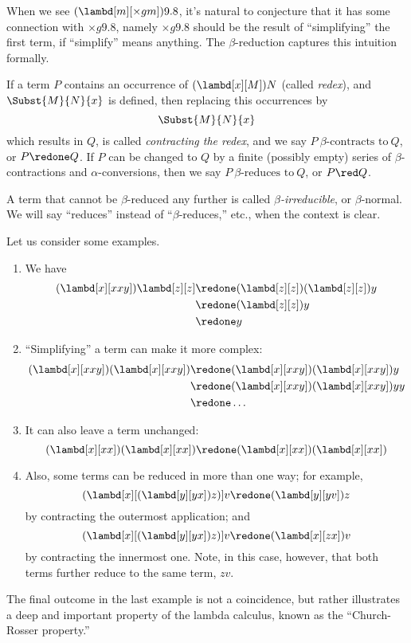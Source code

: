 \documentclass[../../../include/open-logic-section]{subfiles}
\begin{document}

When we see $(\lambd[m][\times g m]) 9.8$, it's natural to
conjecture that it has some connection with $\times g 9.8$,
namely  $\times g 9.8$ should be the result of ``simplifying'' the first term, if
``simplify'' means anything. The $\beta$-reduction captures this
intuition formally.

\begin{defn}
  If a term $P$ contains an occurrence of $(\lambd[x][M])N$ (called \emph{redex}), and $\Subst{M}{N}{x}$
  is defined, then replacing this occurrences by 
  \begin{equation*}
    \Subst{M}{N}{x}
  \end{equation*}
  which results in $Q$, is called \emph{contracting the redex}, and we
  say $P ~\beta\text{-contracts to} ~Q$, or $P \redone Q$.  If $P$ can
  be changed to $Q$ by a finite (possibly empty) series of
  $\beta$-contractions and $\alpha$-conversions, then we say $P
  ~\beta\text{-reduces to}~Q$, or $P \red Q$.
\end{defn}

A term that cannot be $\beta$-reduced any further is called \emph{$\beta$-irreducible}, or
$\beta$-normal. We will say ``reduces'' instead of ``$\beta$-reduces,''
etc., when the context is clear.

Let us consider some examples.
\begin{enumerate}
\item We have
\begin{align*}
(\lambd[x][xxy]) \lambd[z][z] & \redone (\lambd[z][z])(\lambd[z][z]) y \\
& \redone (\lambd[z][z]) y \\
& \redone y
\end{align*}
\item ``Simplifying'' a term can make it more complex:
\begin{align*}
(\lambd[x][xxy])(\lambd[x][xxy]) & \redone (\lambd[x][xxy])(\lambd[x][xxy])y \\
& \redone (\lambd[x][xxy])(\lambd[x][xxy])yy \\
& \redone \dots
\end{align*}
\item It can also leave a term unchanged:
\[
(\lambd[x][xx])(\lambd[x][xx]) \redone (\lambd[x][xx])(\lambd[x][xx])
\]
\item Also, some terms can be reduced in more than one way; for
  example,
\[
(\lambd[x][(\lambd[y][yx]) z)] v \redone (\lambd[y][yv]) z
\]
by contracting the outermost application; and
\[
(\lambd[x][(\lambd[y][yx]) z)] v \redone (\lambd[x][zx]) v
\]
by contracting the innermost one. Note, in this case, however, that
both terms further reduce to the same term, $zv$.
\end{enumerate}

The final outcome in the last example is not a coincidence, but rather
illustrates a deep and important property of the lambda calculus, known as the
``Church-Rosser property.''
\end{document}
